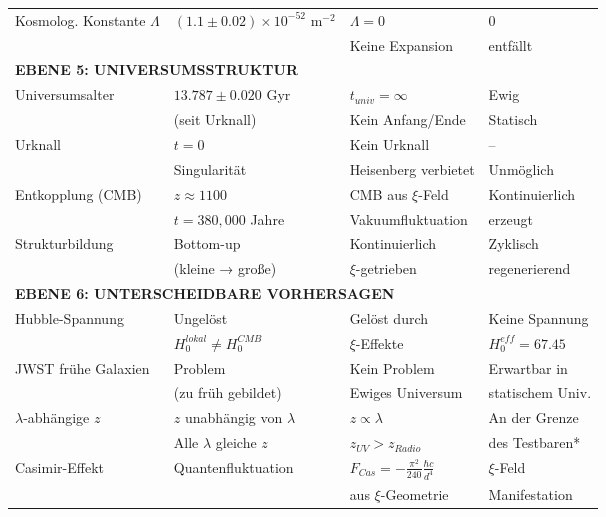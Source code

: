 \documentclass[12pt,a4paper]{article}
\theoremstyle{definition}
\begin{document}
\begin{longtable}{p{5cm}p{4cm}p{3.5cm}p{3.5cm}}
	Kosmolog. Konstante $\Lambda$ & $(1.1 \pm 0.02) \times 10^{-52}$ m$^{-2}$ & $\Lambda = 0$ & $0$ \\
	& & Keine Expansion & entfällt \\[0.3em]
	
	\midrule
	\multicolumn{4}{l}{\textbf{EBENE 5: UNIVERSUMSSTRUKTUR}} \\
	\midrule
	
	Universumsalter & $13.787 \pm 0.020$ Gyr & $t_{univ} = \infty$ & Ewig \\
	& (seit Urknall) & Kein Anfang/Ende & Statisch \\[0.3em]
	
	Urknall & $t = 0$ & Kein Urknall & -- \\
	& Singularität & Heisenberg verbietet & Unmöglich \\[0.3em]
	
	Entkopplung (CMB) & $z \approx 1100$ & CMB aus $\xi$-Feld & Kontinuierlich \\
	& $t = 380,000$ Jahre & Vakuumfluktuation & erzeugt \\[0.3em]
	
	Strukturbildung & Bottom-up & Kontinuierlich & Zyklisch \\
	& (kleine → große) & $\xi$-getrieben & regenerierend \\[0.3em]
	
	\midrule
	\multicolumn{4}{l}{\textbf{EBENE 6: UNTERSCHEIDBARE VORHERSAGEN}} \\
	\midrule
	
	Hubble-Spannung & Ungelöst & Gelöst durch & Keine Spannung \\
	& $H_0^{lokal} \neq H_0^{CMB}$ & $\xi$-Effekte & $H_0^{eff} = 67.45$ \\[0.3em]
	
	JWST frühe Galaxien & Problem & Kein Problem & Erwartbar in \\
	& (zu früh gebildet) & Ewiges Universum & statischem Univ. \\[0.3em]
	
	$\lambda$-abhängige $z$ & $z$ unabhängig von $\lambda$ & $z \propto \lambda$ & An der Grenze \\
	& Alle $\lambda$ gleiche $z$ & $z_{UV} > z_{Radio}$ & des Testbaren* \\[0.3em]
	
	Casimir-Effekt & Quantenfluktuation & $F_{Cas} = -\frac{\pi^2}{240} \frac{\hbar c}{d^4}$ & $\xi$-Feld \\
	& & aus $\xi$-Geometrie & Manifestation \\[0.3em]
	

\end{longtable}
\end{document}

